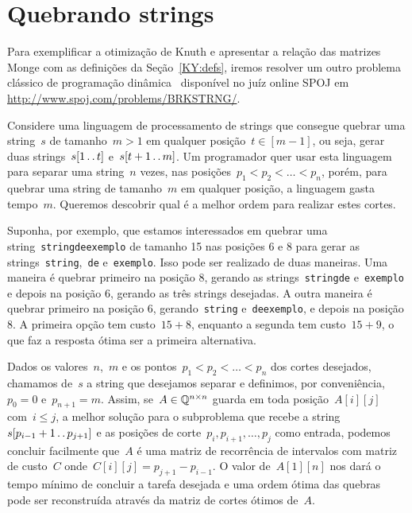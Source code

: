 
\section{Quebrando strings} \label{ KY:brk }

Para exemplificar a otimização de Knuth e apresentar a relação das matrizes Monge com as definições da Seção~\ref{KY:defs}, iremos resolver um outro problema clássico de programação dinâmica~\cite[Exercício~15-9]{CLRS} disponível no juíz online SPOJ em \url{http://www.spoj.com/problems/BRKSTRNG/}. 

Considere uma linguagem de processamento de strings que consegue quebrar uma string~$s$ de tamanho~$m > 1$ em qualquer posição~$t \in [m-1]$, ou seja, gerar duas strings~$s[1 \,.\,.\, t]$ e~$s[t+1 \,.\,.\, m]$. Um programador quer usar esta linguagem para separar uma string~$n$ vezes, nas posições~${p_1 < p_2 < \dots < p_{n}}$, porém, para quebrar uma string de tamanho~$m$ em qualquer posição, a linguagem gasta tempo~$m$. Queremos descobrir qual é a melhor ordem para realizar estes cortes. 

Suponha, por exemplo, que estamos interessados em quebrar uma string~\texttt{stringdeexemplo} de tamanho 15 nas posições 6 e 8 para gerar as strings~\texttt{string},~\texttt{de} e~\texttt{exemplo}. Isso pode ser realizado de duas maneiras. Uma maneira é quebrar primeiro na posição 8, gerando as strings~\texttt{stringde} e~\texttt{exemplo} e depois na posição 6, gerando as três strings desejadas. A outra maneira é quebrar primeiro na posição 6, gerando~\texttt{string} e~\texttt{deexemplo}, e depois na posição 8. A primeira opção tem custo~$15 + 8$, enquanto a segunda tem custo~$15 + 9$, o que faz a resposta ótima ser a primeira alternativa.

Dados os valores~$n$,~$m$ e os pontos~$p_1 < p_2 < \dots < p_{n}$ dos cortes desejados, chamamos de~$s$ a string que desejamos separar e definimos, por conveniência,~$p_0 = 0$ e~$p_{n+1} = m$. Assim, se~${A \in \mathbb{Q}^{n \times n}}$ guarda em toda posição~$A[i][j]$ com~$i \leq j$, a melhor solução para o subproblema que recebe a string~${s[p_{i-1} + 1 \,.\,.\, p_{j+1}]}$ e as posições de corte~$p_{i},p_{i+1},\dots,p_{j}$ como entrada, podemos concluir facilmente que~$A$ é uma matriz de recorrência de intervalos com matriz de custo~$C$ onde~$C[i][j] = p_{j+1} - p_{i-1}$. O valor de~$A[1][n]$ nos dará o tempo mínimo de concluir a tarefa desejada e uma ordem ótima das quebras pode ser reconstruída através da matriz de cortes ótimos de~$A$.

